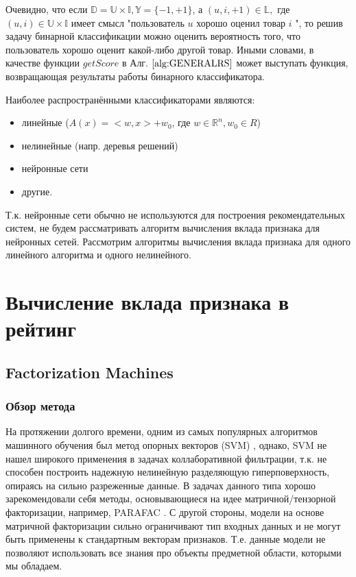 \documentclass[12pt,a4paper]{report}
\begin{document}
Очевидно, что если $\mathbb{D} = \mathbb{U} \times \mathbb{I}, \mathbb{Y} = \{-1, +1\}$, а
 $(u, i, +1) \in \mathbb{L},$ где $(u, i) \in \mathbb{U} \times \mathbb{I}$ имеет смысл "пользователь $u$ хорошо оценил товар $i$  ", то решив задачу бинарной классификации можно оценить вероятность того, что пользователь хорошо оценит какой-либо другой товар. Иными словами, в качестве функции $getScore$ в Алг. $\ref{alg:GENERALRS}$ может выступать функция, возвращающая результаты работы бинарного классификатора.

Наиболее распространёнными классификаторами являются:
\begin{itemize}
\item линейные ($A(x) = <w, x> + w_0$, где $w \in \mathbb{R}^n, w_0 \in R$)
\item нелинейные (напр. деревья решений)
\item нейронные сети
\item другие.
\end{itemize}

Т.к. нейронные сети обычно не используются для построения рекомендательных систем, не будем рассматривать алгоритм вычисления вклада признака для нейронных сетей. Рассмотрим алгоритмы вычисления вклада признака для одного линейного алгоритма и одного нелинейного.
\section{Вычисление вклада признака в рейтинг}
\subsection{Factorization Machines}
\subsubsection{Обзор метода}
На протяжении долгого времени, одним из самых популярных алгоритмов машинного обучения был метод опорных векторов (SVM) \cite{Svm} , однако, SVM не нашел широкого применения в задачах коллаборативной фильтрации, т.к. не способен построить надежную нелинейную разделяющую гиперповерхность, опираясь на сильно разреженные данные. В задачах данного типа хорошо зарекомендовали себя методы, основывающиеся на идее матричной/тензорной факторизации, например, PARAFAC \cite{Parafac}. С другой стороны, модели на основе матричной факторизации сильно ограничивают тип входных данных и не могут быть применены к стандартным векторам признаков. Т.е. данные модели не позволяют использовать все знания про объекты предметной области, которыми мы обладаем.
\end{document}

